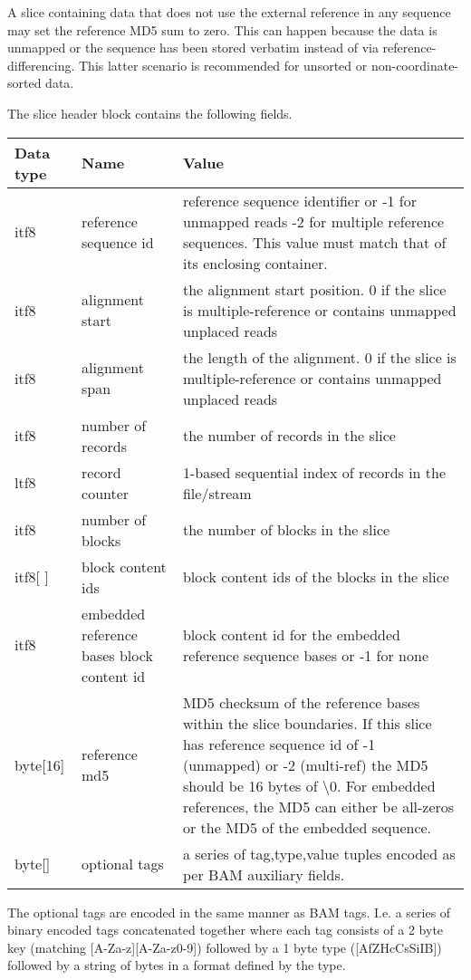 \documentclass[a4paper]{article}
\begin{document}
A slice containing data that does not use the external reference in
any sequence may set the reference MD5 sum to zero.  This can happen
because the data is unmapped or the sequence has been stored verbatim
instead of via reference-differencing.  This latter scenario is
recommended for unsorted or non-coordinate-sorted data.

The slice header block contains the following fields.

\begin{tabular}{|l|l|>{\raggedright}p{200pt}|}
\hline
\textbf{Data type} & \textbf{Name} & \textbf{Value}\tabularnewline
\hline
itf8 & reference sequence id & reference sequence identifier or\linebreak{}
-1 for unmapped reads\linebreak{}
-2 for multiple reference sequences.\linebreak{}
This value must match that of its enclosing container.\tabularnewline
\hline
itf8 & alignment start & the alignment start position.\linebreak{}
0 if the slice is multiple-reference
or contains unmapped unplaced reads\tabularnewline
\hline
itf8 & alignment span & the length of the alignment.\linebreak{}
0 if the slice is multiple-reference
or contains unmapped unplaced reads\tabularnewline
\hline
itf8 & number of records & the number of records in the slice\tabularnewline
\hline
ltf8 & record counter & 1-based sequential index of records in the file/stream\tabularnewline
\hline
itf8 & number of blocks & the number of blocks in the slice\tabularnewline
\hline
itf8[ ] & block content ids & block content ids of the blocks in the slice\tabularnewline
\hline
itf8 & embedded reference bases block content id & block content id for the embedded 
reference sequence bases or -1 for none\tabularnewline
\hline
byte[16] & reference md5 & MD5 checksum of the reference bases within the slice 
boundaries.  If this slice has reference sequence id of -1 (unmapped) or -2 (multi-ref)
the MD5 should be 16 bytes of \textbackslash{}0. For embedded references, the MD5
can either be all-zeros or the MD5 of the embedded sequence.\tabularnewline
\hline
byte[] & optional tags & a series of tag,type,value tuples encoded as
per BAM auxiliary fields.\tabularnewline
\hline
\end{tabular}

The optional tags are encoded in the same manner as BAM tags.  I.e. a
series of binary encoded tags concatenated together where each tag
consists of a 2 byte key (matching [A-Za-z][A-Za-z0-9]) followed by a
1 byte type ([AfZHcCsSiIB]) followed by a string of bytes in a format
defined by the type.
\end{document}
